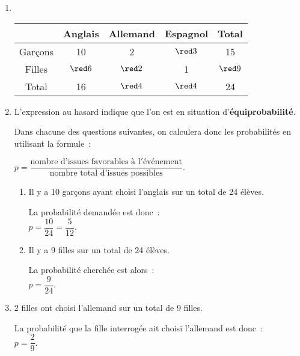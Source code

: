 \begin{corrige}
     \begin{enumerate}
          \item %
          ~\\
          \begin{center}
               \begin{tabular}{|c|c|c|c|c|} %
                    \hline
                    & Anglais & Allemand & Espagnol & Total \\
                    \hline
                    Garçons & 10 & 2 & $\red 3$   & 15 \\
                    \hline
                    Filles & $\red 6$   & $\red 2$   & 1 &  $\red 9$  \\
                    \hline
                    Total & 16  &  $\red 4$  & $\red 4$  &  24 \\
                    \hline
               \end{tabular}
          \end{center}
          \item %
          L'expression \og au hasard \fg{} indique que l'on est en situation d'\textbf{équiprobabilité}.
          \par
          Dans chacune des questions suivantes, on calculera donc les probabilités en utilisant la formule~:
          \begin{center}
               $p=\dfrac{\text{nombre d'issues favorables à l}'\text{événement}}{\text{nombre total d'issues possibles}}.$
          \end{center}
          \begin{enumerate}[label=\alph*.]
               \item %
               Il y a 10 garçons ayant choisi l'anglais sur un total de 24 élèves.
               \par
               La probabilité demandée est donc~:\\
               $p=\dfrac{10}{24}=\dfrac{5}{12}.$
               \item %
               Il y a 9 filles  sur un total de 24 élèves.
               \par
               La probabilité cherchée est alors~:\\
               $p=\dfrac{9}{24}.$
          \end{enumerate}
          \item %
          2 filles ont choisi l'allemand sur un total de 9 filles.
          \par
          La probabilité que la fille interrogée ait choisi l'allemand est donc~:\\
          $p=\dfrac{2}{9}.$
     \end{enumerate}
\end{corrige}
